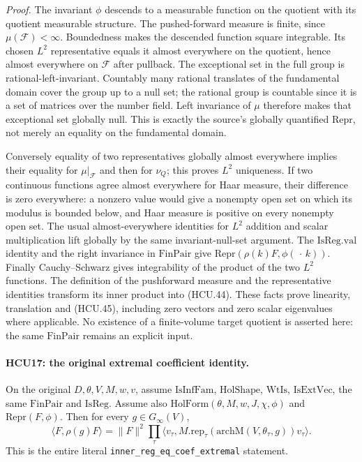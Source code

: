 \emph{Proof.}
The invariant \(\phi\) descends to a measurable function on the
quotient with its quotient measurable structure.  The pushed-forward
measure is finite, since \(\mu(\mathcal F)<\infty\).
Boundedness makes the descended function square integrable.
Its chosen \(L^2\) representative equals it almost everywhere on the
quotient, hence almost everywhere on \(\mathcal F\) after pullback.
The exceptional set in the full group is rational-left-invariant.
Countably many rational translates of the fundamental domain cover
the group up to a null set; the rational group is countable since
it is a set of matrices over the number field.
Left invariance of \(\mu\) therefore makes that exceptional set
globally null.  This is exactly the source's globally quantified
\(\mathrm{Repr}\), not merely an equality on the fundamental domain.

Conversely equality of two representatives globally almost everywhere
implies their equality for \(\mu|_{\mathcal F}\) and then for \(\nu_Q\);
this proves \(L^2\) uniqueness.
If two continuous functions agree almost everywhere for Haar measure,
their difference is zero everywhere: a nonzero value would give a
nonempty open set on which its modulus is bounded below, and Haar
measure is positive on every nonempty open set.
The usual almost-everywhere identities for \(L^2\) addition and scalar
multiplication lift globally by the same invariant-null-set argument.
The \(\mathrm{IsReg.val}\) identity and the right invariance in
\(\mathrm{FinPair}\) give
\(\mathrm{Repr}(\rho(k)F,\phi(\,\cdot\,k))\).
Finally Cauchy--Schwarz gives integrability of the product of the two
\(L^2\) functions.  The definition of the pushforward measure and
the representative identities transform its inner product into
(HCU.44).  These facts prove linearity, translation and (HCU.45),
including zero vectors and zero scalar eigenvalues where applicable.
No existence of a finite-volume target quotient is asserted here:
the same \(\mathrm{FinPair}\) remains an explicit input.

\paragraph{HCU17: the original extremal coefficient identity.}
\label{claim:HCU17}
On the original \(D,\theta,V,M,w,v\), assume
\(\mathrm{IsInfFam}\), \(\mathrm{HolShape}\), \(\mathrm{WtIs}\),
\(\mathrm{IsExtVec}\), the same \(\mathrm{FinPair}\) and
\(\mathrm{IsReg}\).
Assume also \(\mathrm{HolForm}(\theta,M,w,J,\chi,\phi)\)
and \(\mathrm{Repr}(F,\phi)\).
Then for every \(g\in G_\infty(V)\),
\[
 \langle F,\rho(g)F\rangle
 =\|F\|^2\prod_\tau
  \langle v_\tau,M.\mathrm{rep}_\tau
          (\mathrm{archM}(V,\theta_\tau,g))v_\tau\rangle .
 \tag{HCU.46}
\]
This is the entire literal
\texttt{inner\_reg\_eq\_coef\_extremal} statement.

